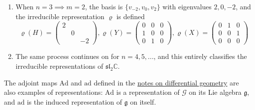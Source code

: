\begin{enumerate}
    \item When $n=3 \implies m=2$, the basis is $\{v_{-2}, v_0, v_2\}$ with eigenvalues $2, 0, -2$, and the irreducible representation $\varrho$ is defined
      \begin{equation}
        \varrho(H) = \begin{pmatrix}
        2&&\\&0&\\&&-2
        \end{pmatrix}, \varrho(Y) = \begin{pmatrix}
        0&0&0\\1&0&0\\0&1&0
        \end{pmatrix}, \varrho(X) = \begin{pmatrix}
        0&1&0\\0&0&1\\0&0&0
        \end{pmatrix}
      \end{equation}

    \item The same process continues on for $n=4, 5, ...$, and this entirely classifies the irreducible representations of $\mathfrak{sl}_2 \mathbb{C}$. 
  \end{enumerate} 


  The adjoint maps $\mathrm{Ad}$ and $\mathrm{ad}$ defined in the \hyperref[dg-def:the-adjoint-map-of-a-lie-group]{notes on differential geometry} are also examples of representations: $\mathrm{Ad}$ is a representation of $\mathcal{G}$ on its Lie algebra $\mathfrak{g}$, and $\mathrm{ad}$ is the induced representation of $\mathfrak{g}$ on itself. 
